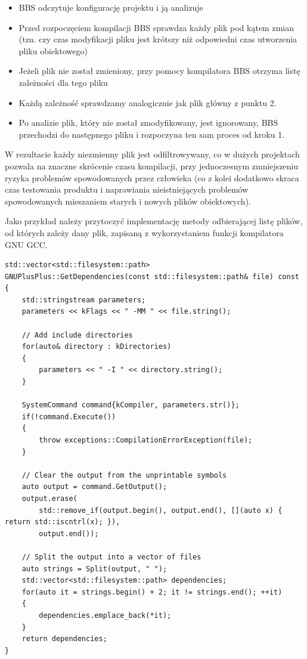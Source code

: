 \begin{itemize}
    \item BBS odczytuje konfigurację projektu i ją analizuje
    \item Przed rozpoczęciem kompilacji BBS sprawdza każdy plik pod kątem zmian (tzn. czy czas modyfikacji pliku jest krótszy niż odpowiedni czas utworzenia pliku obiektowego)
    \item Jeżeli plik nie został zmieniony, przy pomocy kompilatora BBS otrzyma listę zależności dla tego pliku
    \item Każdą zależność sprawdzamy analogicznie jak plik główny z punktu 2.
    \item Po analizie plik, który nie został zmodyfikowany, jest ignorowany, BBS przechodzi do następnego pliku i rozpoczyna ten sam proces od kroku 1.
\end{itemize}

W rezultacie każdy niezmienny plik jest odfiltrowywany, co w dużych projektach pozwala na znaczne skrócenie czasu kompilacji, przy jednoczesnym zmniejszeniu ryzyka problemów spowodowanych przez człowieka (co z kolei dodatkowo skraca czas testowania produktu i naprawiania nieistniejących problemów spowodowanych mieszaniem starych i nowych plików obiektowych).

Jako przykład należy przytoczyć implementację metody odbierającej listę plików, od których zależy dany plik, zapisaną z wykorzystaniem funkcji kompilatora GNU GCC.

\begin{lstlisting}[label=list:dependencies,caption=Implementacja metody GNUPlusPlus::GetDependencies(),basicstyle=\footnotesize\ttfamily]
std::vector<std::filesystem::path>
GNUPlusPlus::GetDependencies(const std::filesystem::path& file) const
{
	std::stringstream parameters;
	parameters << kFlags << " -MM " << file.string();

	// Add include directories
	for(auto& directory : kDirectories)
	{
		parameters << " -I " << directory.string();
	}

	SystemCommand command{kCompiler, parameters.str()};
	if(!command.Execute())
	{
		throw exceptions::CompilationErrorException(file);
	}

	// Clear the output from the unprintable symbols
	auto output = command.GetOutput();
	output.erase(
		std::remove_if(output.begin(), output.end(), [](auto x) { return std::iscntrl(x); }),
		output.end());

	// Split the output into a vector of files
	auto strings = Split(output, " ");
	std::vector<std::filesystem::path> dependencies;
	for(auto it = strings.begin() + 2; it != strings.end(); ++it)
	{
		dependencies.emplace_back(*it);
	}
	return dependencies;
}
\end{lstlisting}

